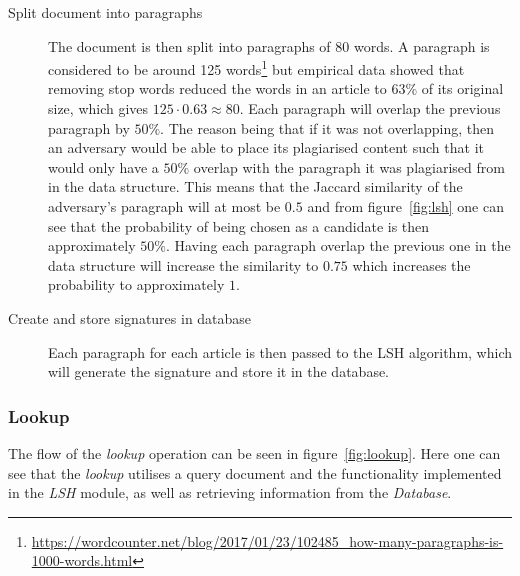 \begin{description}
    \item[Split document into paragraphs] The document is then split into paragraphs of 80 words. A paragraph is considered to be around 125 words\footnote{\url{https://wordcounter.net/blog/2017/01/23/102485_how-many-paragraphs-is-1000-words.html}} but empirical data showed that removing stop words reduced the words in an article to $63\%$ of its original size, which gives $125 \cdot 0.63 \approx 80$. Each paragraph will overlap the previous paragraph by $50\%$. The reason being that if it was not overlapping, then an adversary would be able to place its plagiarised content such that it would only have a $50\%$ overlap with the paragraph it was plagiarised from in the data structure. This means that the Jaccard similarity of the adversary's paragraph will at most be $0.5$ and from figure~\ref{fig:lsh} one can see that the probability of being chosen as a candidate is then approximately $50\%$. Having each paragraph overlap the previous one in the data structure will increase the similarity to $0.75$ which increases the probability to approximately $1$.
    \item[Create and store signatures in database] Each paragraph for each article is then passed to the LSH algorithm, which will generate the signature and store it in the database.
\end{description}

\subsubsection{Lookup}
The flow of the \emph{lookup} operation can be seen in figure~\ref{fig:lookup}. Here one can see that the \emph{lookup} utilises a query document and the functionality implemented in the \emph{LSH} module, as well as retrieving information from the \emph{Database}.

